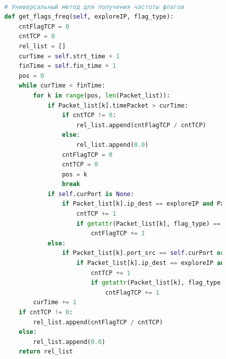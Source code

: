 \documentclass[bachelor, och, coursework]{SCWorks}
\begin{document}
\begin{lstlisting}[language=Python]
      
          # Универсальный метод для получения частоты флагов
          def get_flags_freq(self, exploreIP, flag_type):
              cntFlagTCP = 0
              cntTCP = 0
              rel_list = []
              curTime = self.strt_time + 1
              finTime = self.fin_time + 1
              pos = 0
              while curTime < finTime:
                  for k in range(pos, len(Packet_list)):
                      if Packet_list[k].timePacket > curTime:
                          if cntTCP != 0:
                              rel_list.append(cntFlagTCP / cntTCP)
                          else:
                              rel_list.append(0.0)
                          cntFlagTCP = 0
                          cntTCP = 0
                          pos = k
                          break
                      if self.curPort is None:
                          if Packet_list[k].ip_dest == exploreIP and Packet_list[k].protoType == 'TCP':
                              cntTCP += 1
                              if getattr(Packet_list[k], flag_type) == '1':
                                  cntFlagTCP += 1
                      else:
                          if Packet_list[k].port_src == self.curPort or Packet_list[k].port_dest == self.curPort:
                              if Packet_list[k].ip_dest == exploreIP and Packet_list[k].protoType == 'TCP':
                                  cntTCP += 1
                                  if getattr(Packet_list[k], flag_type) == '1':
                                      cntFlagTCP += 1
                  curTime += 1
              if cntTCP != 0:
                  rel_list.append(cntFlagTCP / cntTCP)
              else:
                  rel_list.append(0.0)
              return rel_list
      

\end{lstlisting}
\end{document}
